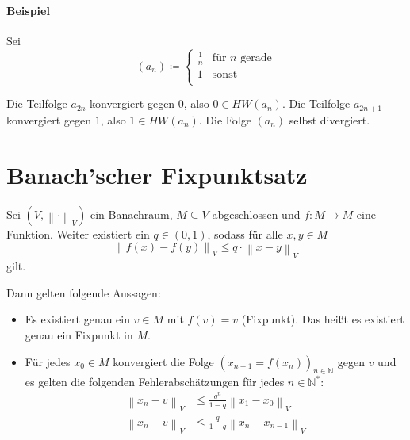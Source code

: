 \documentclass[a4paper, 11pt, accentcolor = tud3b]{tudreport}
\newcommand{\norm}[1]{\left \lVert #1 \right \rVert}
\begin{document}
            \paragraph{Beispiel}
                Sei
                \begin{equation*}
                    (a _ n) \coloneqq
                    \begin{cases}
                        \frac{1}{n} & \text{für } n \text{ gerade} \\
                        1           & \text{sonst} \\
                    \end{cases}
                \end{equation*}

                Die Teilfolge $ a _ { 2n } $ konvergiert gegen $ 0 $, also $ 0 \in HW(a _ n) $. Die Teilfolge $ a _ { 2n + 1 } $ konvergiert gegen $ 1 $, also $ 1 \in HW(a _ n) $. Die Folge $ (a _ n) $ selbst divergiert.

        \section{Banach'scher Fixpunktsatz}
            Sei $ (V, \norm{\cdot} _ V) $ ein Banachraum, $ M \subseteq V $ abgeschlossen und $ f : M \rightarrow M $ eine Funktion. Weiter existiert ein $ q \in (0, 1) $, sodass für alle $ x, y \in M $ \[ \norm{f(x) - f(y)} _ V \leq q \cdot \norm{x - y} _ V \] gilt.

            Dann gelten folgende Aussagen:
            \begin{itemize}
                \item Es existiert genau ein $ v \in M $ mit $ f(v) = v $ (Fixpunkt). Das heißt es existiert genau ein Fixpunkt in $ M $.
                \item Für jedes $ x _ 0 \in M $ konvergiert die Folge $ (x _ { n + 1 } = f(x _ n)) _ { n \in \mathbb{N} } $ gegen $ v $ und es gelten die folgenden Fehlerabschätzungen für jedes $ n \in \mathbb{N} ^ * $:
                    \begin{align*}
                        \norm{x _ n - v} _ V &\leq \frac{q ^ n}{1 - q} \norm{x _ 1 - x _ 0} _ V \tag{A-priori-Abschätzung} \\
                        \norm{x _ n - v} _ V &\leq \frac{q}{1 - q} \norm{x _ n - x _ { n - 1 }} _ V \tag{A-posteriori-Abschätzung} \\
                    \end{align*}
            \end{itemize}
\end{document}
